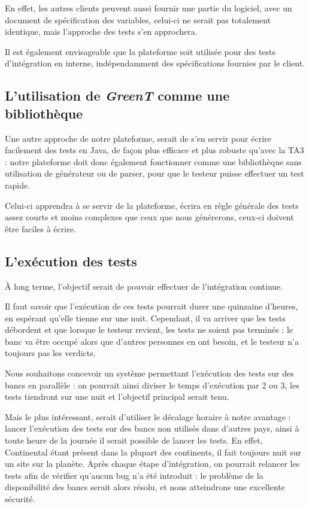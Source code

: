 	En effet, les autres clients peuvent aussi fournir une partie du logiciel, avec un document de spécification des variables, celui-ci ne serait pas totalement identique, mais l'approche des tests s'en approchera.

	Il est également envisageable que la plateforme soit utilisée pour des tests d'intégration en interne, indépendamment des spécifications fournies par le client.

	\subsection{L'utilisation de \textit{GreenT} comme une bibliothèque}
		Une autre approche de notre plateforme, serait de s'en servir pour écrire facilement des tests en Java, de façon plus efficace et plus robuste qu'avec la TA3 : notre plateforme doit donc également fonctionner comme une bibliothèque sans utilisation de générateur ou de parser, pour que le testeur puisse effectuer un test rapide. 

		Celui-ci apprendra à se servir de la plateforme, écrira en règle générale des tests assez courts et moins complexes que ceux que nous générerons, ceux-ci doivent être faciles à écrire.

	\subsection{L'exécution des tests}
	À long terme, l'objectif serait de pouvoir effectuer de l'intégration continue. 

	Il faut savoir que l'exécution de ces tests pourrait durer une quinzaine d'heures, en espérant qu'elle tienne sur une nuit. Cependant, il va arriver que les tests débordent et que lorsque le testeur revient, les tests ne soient pas terminés : le banc va être occupé alors que d'autres personnes en ont besoin, et le testeur n'a toujours pas les verdicts.

	 Nous souhaitons concevoir un système permettant l'exécution des tests sur des bancs en parallèle : on pourrait ainsi diviser le temps d'exécution par 2 ou 3, les tests tiendront sur une nuit et l'objectif principal serait tenu.

	 Mais le plus intéressant, serait d'utiliser le décalage horaire à notre avantage : lancer l'exécution des tests sur des bancs non utilisés dans d'autres pays, ainsi à toute heure de la journée il serait possible de lancer les tests. En effet, Continental étant présent dans la plupart des continents, il fait toujours nuit sur un site sur la planète. Après chaque étape d'intégration, on pourrait relancer les tests afin de vérifier qu'aucun bug n'a été introduit : le problème de la disponibilité des bancs serait alors résolu, et nous atteindrons une excellente sécurité.

